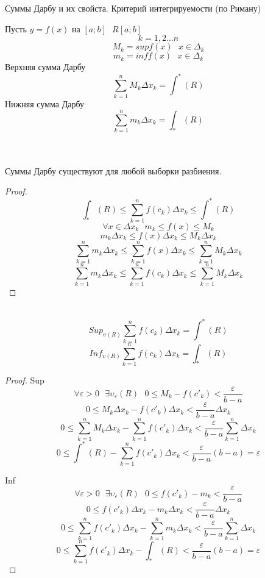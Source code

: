 \begin{title}[\Large]
  Суммы Дарбу и их свойста. Критерий интегрируемости (по Риману)
\end{title}

Пусть $y = f(x)$ на $[a; b] ~~~ R[a; b]$
\[k = 1, 2 ... n\]
\[M_k = sup f(x) ~~~ x \in \Delta_k\]
\[m_k = inf f(x) ~~~ x \in \Delta_k\]
Верхняя сумма Дарбу
\[\sum^{n}_{k = 1}M_k \Delta x_k = \int^* (R)\]
Нижняя сумма Дарбу
\[\sum^{n}_{k = 1}m_k \Delta x_k = \int_* (R)\]

\\
\\
Суммы Дарбу существуют для любой выборки разбиения.\\
\begin{proof}
  \[\int_* (R) \le \sum_{k = 1}^{n} f(c_k) \Delta x_k \le \int^* (R)\]
  \[\forall x \in \Delta x_k ~~~ m_k \le f(x) \le M_k\]
  \[
     m_k \Delta x_k \le f(x) \Delta x_k \le
     M_k \Delta x_k
  \]
  \[
     \sum_{k = 1}^{n} m_k \Delta x_k \le \sum_{k = 1}^{n} f(x)
     \Delta x_k \le \sum_{k = 1}^{n} M_k \Delta x_k
  \]
  \[
     \sum_{k = 1}^{n} m_k \Delta x_k \le \sum_{k = 1}^{n} f(c_k)
    \Delta x_k \le \sum_{k = 1}^{n} M_k \Delta x_k
  \]
\end{proof}

\\
\[Sup_{\upsilon (R)} \sum_{k = 1}^{n} f(c_k) \Delta x_k = \int^* (R)\]
\[Inf_{\upsilon (R)} \sum_{k = 1}^{n} f(c_k) \Delta x_k = \int_* (R)\]

\begin{proof}
  Sup
  \[
     \forall \varepsilon > 0 ~~~ \exists \upsilon_\varepsilon (R) ~~~ 0 \le
     M_k - f(c'_k) < \frac{\varepsilon}{b - a}
  \]
  \[
     0 \le M_k \Delta x_k - f(c'_k) \Delta x_k <
     \frac{\varepsilon}{b - a}\Delta x_k
  \]
  \[
     0 \le \sum_{k = 1}^{n} M_k \Delta x_k - \sum_{k = 1}^{n} f(c'_k)
     \Delta x_k < \frac{\varepsilon}{b - a} \sum_{k = 1}^{n} \Delta x_k
  \]
  \[
     0 \le \int^* (R) - \sum_{k = 1}^{n} f(c'_k) \Delta x_k <
     \frac{\varepsilon}{b - a} (b - a) = \varepsilon
  \]

  Inf
  \[
     \forall \varepsilon > 0 ~~~ \exists \upsilon_\varepsilon (R) ~~~ 0 \le
      f(c'_k) - m_k < \frac{\varepsilon}{b - a}
  \]
  \[
     0 \le f(c'_k) \Delta x_k - m_k \Delta x_k <
     \frac{\varepsilon}{b - a}\Delta x_k
  \]
  \[
     0 \le \sum_{k = 1}^{n} f(c'_k) \Delta x_k - \sum_{k = 1}^{n} m_k \Delta x_k
     < \frac{\varepsilon}{b - a} \sum_{k = 1}^{n} \Delta x_k
  \]
  \[
     0 \le \sum_{k = 1}^{n} f(c'_k) \Delta x_k - \int_* (R) <
     \frac{\varepsilon}{b - a} (b - a) = \varepsilon
  \]
\end{proof}

